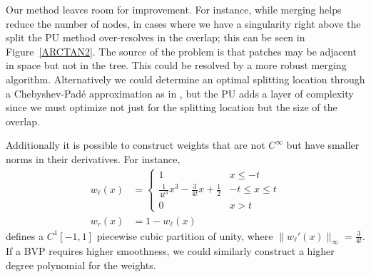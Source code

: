 Our method leaves room for improvement. For instance, while merging helps reduce the number of nodes, in cases where we have a singularity right above the split the PU method over-resolves in the overlap; this can be seen in Figure~\ref{ARCTAN2}. The source of the problem is that patches may be adjacent in space but not in the tree. This could be resolved by a more robust merging algorithm. Alternatively we could determine an optimal splitting location through a Chebyshev-Pad\'{e} approximation as in \cite{driscoll2014optimal}, but the PU adds a layer of complexity since we must optimize not just for the splitting location but the size of the overlap.

Additionally it is possible to construct weights that are not $C^{\infty}$ but have smaller norms in their derivatives. For instance,
\begin{equation}
\begin{aligned}
w_{\ell}(x) &= \begin{cases}
1 & x \leq -t \\
\frac{1}{4t^3} x^3 - \frac{3}{4 t} x+\frac{1}{2} & -t\leq x \leq t \\
0 & x>t
 \end{cases} \\
 w_{r}(x) &= 1-w_{\ell}(x)
\end{aligned}
\end{equation}
defines a $C^1[-1,1]$ piecewise cubic partition of unity, where $\| w_{\ell}'(x)\|_{\infty} = \frac{3}{4t}$. If a BVP requires higher smoothness, we could similarly construct a higher degree polynomial for the weights.